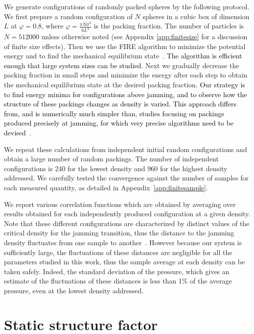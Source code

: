 \documentclass[aps,pre,twocolumn,superscriptaddress]{revtex4-1}
\renewcommand{\phi}{\varphi}
\newcommand{\red}[1]{\textcolor{black}{#1}}
\begin{document}
We generate configurations of randomly packed spheres by the following 
protocol. We first prepare a random configuration of $N$ spheres in 
a cubic box of dimension $L$ at $\phi=0.8$, 
where $\phi = \frac{\pi N \sigma^3}{6 L^3}$ is the packing fraction.  
The number of particles is $N=512000$ unless otherwise noted
(see Appendix \ref{app:finitesize} for a discussion of finite size 
effects).
Then we use the FIRE algorithm to minimize the potential energy and to 
find the mechanical equilibrium state~\cite{bitzek2006}.
\red{The algorithm is efficient enough that large system sizes 
can be studied.}
Next we gradually decrease the packing fraction in small steps
and minimize the energy after each step to obtain 
the mechanical equilibrium state at the desired packing fraction. 
\red{Our strategy is to find energy minima for configurations 
above jamming, and to observe how the structure of these packings changes 
as density is varied. This approach differs from, and is numerically
much simpler than, studies focusing on packings produced 
precisely at jamming, for which very precise algorithms need to be 
devised~\cite{atkinson2016b,eric}.} 

We repeat these calculations from independent 
initial random configurations and obtain a large number of random packings. 
The number of independent configurations is 240 for the lowest density 
and 960 for the highest density addressed. We carefully tested the convergence
against the number of samples for each measured quantity,
as detailed in Appendix~\ref{app:finitesample}.

We report various correlation functions which are obtained by 
averaging over results obtained for each independently produced  
configuration at a given density. 
Note that these different configurations are characterized by 
distinct values of the critical density for the jamming transition,
thus the distance to the jamming density fluctuates from one sample
to another~\cite{ohern2003}. 
However because our system is sufficiently large, 
the fluctuations of these distances are negligible 
for all the parameters studied in this work, 
thus the sample average at each density can be taken safely. 
Indeed, the standard deviation of the pressure, which gives an 
estimate of the fluctuations of these distances  
is less than 1\% of the average pressure, even at 
the lowest density addressed. 

\section{Static structure factor}
\label{sec:sk}
\end{document}
